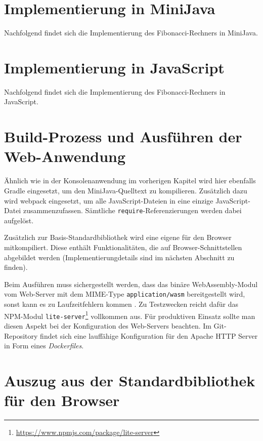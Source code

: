 \section{Implementierung in MiniJava}

Nachfolgend findet sich die Implementierung des Fibonacci-Rechners in MiniJava.

\pagebreak



\section{Implementierung in JavaScript}

Nachfolgend findet sich die Implementierung des Fibonacci-Rechners in JavaScript.


\section{Build-Prozess und Ausführen der Web-Anwendung}

Ähnlich wie in der Konsolenanwendung im vorherigen Kapitel wird hier ebenfalls Gradle eingesetzt, um den MiniJava-Quelltext zu kompilieren. Zusätzlich dazu wird webpack \cite{Webpack} eingesetzt, um alle JavaScript-Dateien in eine einzige JavaScript-Datei zusammenzufassen. Sämtliche \lstinline{require}-Referenzierungen werden dabei aufgelöst.

Zusätzlich zur Basis-Standardbibliothek wird eine eigene für den Browser mitkompiliert. Diese enthält Funktionalitäten, die auf Browser-Schnittstellen abgebildet werden (Implementierungdetails sind im nächsten Abschnitt zu finden).

Beim Ausführen muss sichergestellt werden, dass das binäre WebAssembly-Modul vom Web-Server mit dem MIME-Type \lstinline{application/wasm} bereitgestellt wird, sonst kann es zu Laufzeitfehlern kommen \cite{MDNWebAssembly}. Zu Testzwecken reicht dafür das NPM-Modul \lstinline{lite-server}\footnote{\url{https://www.npmjs.com/package/lite-server}} vollkommen aus. Für produktiven Einsatz sollte man diesen Aspekt bei der Konfiguration des Web-Servers beachten. Im Git-Repository findet sich eine lauffähige Konfiguration für den Apache HTTP Server in Form eines \emph{Dockerfiles}.

\section{Auszug aus der Standardbibliothek für den Browser}

